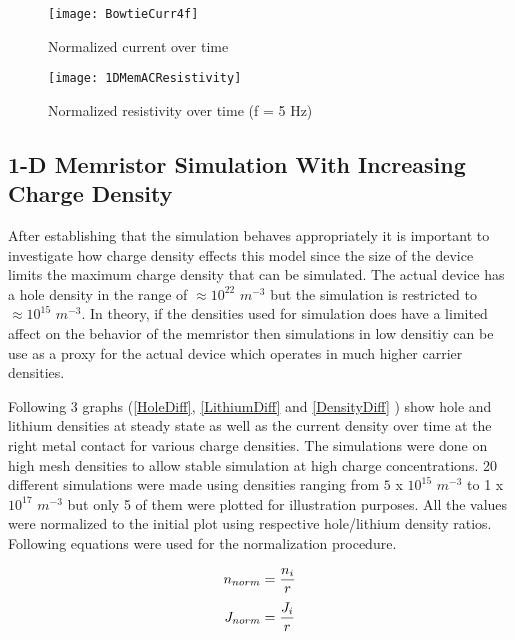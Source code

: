 {\begin{figure}[!htp]
\centering
\texttt{[image: BowtieCurr4f]}
\caption{Normalized current over time} 
\label{BowtieCurr}
\end{figure}


\begin{landscape}
\begin{figure}[!htp]
\centering
\texttt{[image: 1DMemACResistivity]}
\caption{Normalized resistivity over time (f = 5 Hz)} 
\label{BowtieRes}
\end{figure}
\end{landscape} 



\clearpage
\subsection{1-D Memristor Simulation With Increasing Charge Density}

After establishing that the simulation behaves appropriately it is important to investigate how charge density effects this model since the size of the device limits the maximum charge density that can be simulated. The actual device has a hole density in the range of $ \approx 10^{22}$ $m^{-3}$ but the simulation is restricted to $\approx 10^{15}$ $m^{-3}$. In theory, if the densities used for simulation does have a limited affect on the behavior of the memristor then simulations in low densitiy can be use as a proxy for the actual device which operates in much higher carrier densities.

 Following 3 graphs (\ref{HoleDiff}, \ref{LithiumDiff} and \ref{DensityDiff} ) show hole and lithium densities at steady state as well as the current density over time at the right metal contact for various charge densities. The simulations were done on high mesh densities to allow stable simulation at high charge concentrations. 20 different simulations were made using densities ranging from $5$ x $10^{15}$  $m^{-3}$ to 1 x $10^{17}$  $m^{-3}$ but only 5 of them were plotted for illustration purposes. All the values were normalized to the initial plot using respective hole/lithium density ratios. Following equations were used for the normalization procedure.


\begin{equation}
\centering
n_{norm}= \frac{n_i}{r} 
\end{equation}
\begin{equation}
\centering
J_{norm}= \frac{J_i}{r} 
\end{equation}

}
